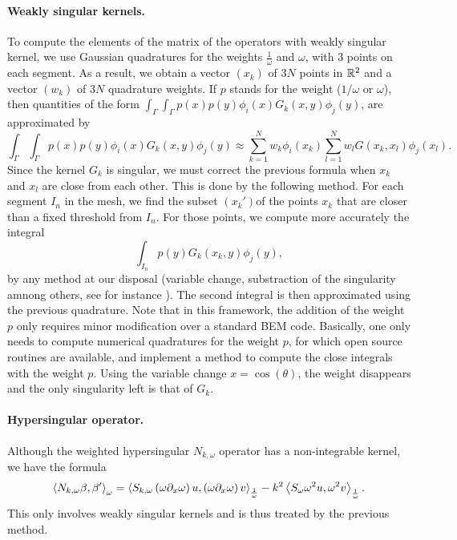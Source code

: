 \documentclass[a4paper]{article}
\begin{document}
\paragraph{Weakly singular kernels.} To compute the elements of the matrix of the operators with weakly singular kernel, we use Gaussian quadratures for the weights $\frac{1}{\omega}$ and $\omega$, with $3$ points on each segment. As a result, we obtain a vector $(x_k)$ of $3N$ points in $\mathbb{R}^2$ and a vector $(w_k)$ of $3N$ quadrature weights. If $p$ stands for the weight ($1/\omega$ or $\omega$), then quantities of the form $\int_\Gamma \int_\Gamma  p(x)p(y)\phi_i(x) G_k(x,y) \phi_j(y)$, are approximated by
\begin{equation}
\label{approxDoubleIntegral}
\int_\Gamma \int_\Gamma   p(x)p(y)\phi_i(x) G_k(x,y) \phi_j(y) \approx \sum_{k = 1}^N w_k \phi_i(x_k) \sum_{l = 1}^N  w_l G(x_k,x_l) \phi_j(x_l).
\end{equation}
Since the kernel $G_k$ is singular, we must correct the previous formula when $x_k$ and $x_l$ are close from each other. This is done by the following method. For each segment $I_n$ in the mesh, we find the subset $(x_k')$of the points $x_k$ that are closer than a fixed threshold from $I_n$. For those points, we compute more accurately the integral 
\[ \int_{I_n} p(y)G_k(x_k,y) \phi_j(y),\]
by any method at our disposal (variable change, substraction of the singularity amnong others, see for instance \cite{sauter2011boundary}). The second integral is then approximated using the previous quadrature. 
Note that in this framework, the addition of the weight $p$ only requires minor modification over a standard BEM code. Basically, one only needs to compute numerical quadratures for the weight $p$, for which open source routines are available, and implement a method to compute the close integrals with the weight $p$. Using the variable change $x = \cos(\theta)$, the weight disappears and the only singularity left is that of $G_k$. 

\paragraph{Hypersingular operator.} Although the weighted hypersingular $N_{k,\omega}$ operator has a non-integrable kernel, we have the formula
\[\left\langle N_{k,\omega} \beta,\beta'\right\rangle_\omega = \left\langle S_{k,\omega}\left(\omega \partial_x \omega \right)u,\left(\omega \partial_x \omega \right) v\right\rangle_\frac{1}{\omega} - k^2 \left\langle S_\omega \omega^2 u,\omega^2 v\right\rangle_\frac{1}{\omega}.\]
This only involves weakly singular kernels and is thus treated by the previous method. 
\end{document}
